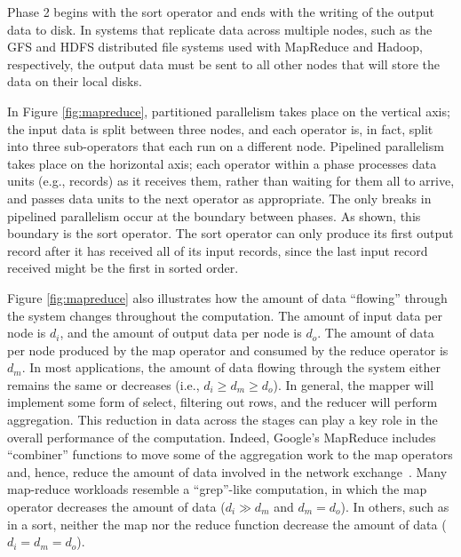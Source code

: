 Phase 2 begins with the sort operator and ends with the writing of the output
data to disk. In systems that replicate data across multiple nodes,
such as the GFS \cite{gfs} and HDFS \cite{hdfs} distributed file systems
used with MapReduce and Hadoop, respectively, the output data must be sent
to all other nodes that will store the data on their local disks.

In Figure \ref{fig:mapreduce},
partitioned parallelism takes place on the vertical axis;
the input data is split between three nodes, and each operator
is, in fact, split into three sub-operators that each run on a different node.
Pipelined parallelism takes place on the horizontal axis;
each operator within a phase processes data units (e.g., records) as it
receives them, rather than waiting for them all to arrive, and passes data
units to the next operator as appropriate.
The only breaks in pipelined parallelism occur at the boundary between phases.
As shown, this boundary is the sort operator.
The sort operator can only produce its first output record after it has
received all of its input records, since the last input record received
might be the first in sorted order.

Figure \ref{fig:mapreduce} also illustrates how the amount of data ``flowing''
through the system changes throughout the computation. The amount of input data
per node is $d_i$, and the amount of output data per node is $d_o$. The amount
of data per node produced by the map operator and consumed by the reduce
operator is $d_m$. In most applications, the amount of data flowing through the
system either remains the same or decreases (i.e., $d_i \ge d_m \ge d_o$). 
In general, the mapper will implement some form of select, filtering out
rows, and the reducer will perform aggregation.  This reduction in data across the stages can play a key
role in the overall performance of the computation.  Indeed, Google's
MapReduce includes ``combiner'' functions
to move some of the aggregation work to the map operators and, hence,
reduce the amount of data involved in the network exchange~\cite{mapreduce}.
Many map-reduce workloads resemble a ``grep''-like computation, in which the map operator decreases
the amount of data ($d_i \gg d_m$ and $d_m = d_o$).
In others, such as in a sort, neither the map nor the reduce
function decrease the amount of data ($d_i = d_m = d_o$).

